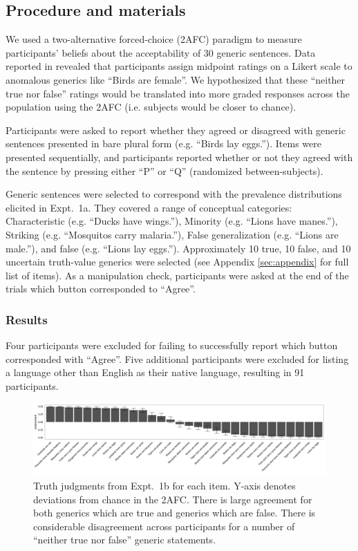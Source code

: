 \documentclass[10pt,letterpaper]{article}
\begin{document}
\subsection{Procedure and materials}

We used a two-alternative forced-choice (2AFC) paradigm to measure participants' beliefs about the acceptability of 30 generic sentences. 
Data reported in  revealed that participants assign midpoint ratings on a Likert scale to anomalous generics like ``Birds are female''. 
We hypothesized that these ``neither true nor false'' ratings would be translated into more graded responses across the population using the 2AFC (i.e. subjects would be closer to chance).

Participants were asked to report whether they agreed or disagreed with generic sentences presented in bare plural form (e.g. ``Birds lay eggs.''). 
Items were presented sequentially, and participants reported whether or not they agreed with the sentence by pressing either ``P'' or ``Q'' (randomized between-subjects). 

Generic sentences were selected to correspond with the prevalence distributions elicited in Expt.~1a. 
They covered a range of conceptual categories: Characteristic (e.g. ``Ducks have wings.''), Minority (e.g. ``Lions have manes.''), Striking (e.g. ``Mosquitos carry malaria.''), False generalization (e.g. ``Lions are male.''), and false (e.g. ``Lions lay eggs.'').
Approximately 10 true, 10 false, and 10 uncertain truth-value generics were selected (see Appendix \ref{sec:appendix} for full list of items).
As a manipulation check, participants were asked at the end of the trials which button corresponded to ``Agree''.

\subsubsection{Results}

Four participants were excluded for failing to successfully report which button corresponded with ``Agree''. 
Five additional participants were excluded for listing a language other than English as their native language, resulting in 91 participants.


\begin{figure}
\centering
    \includegraphics[width=\columnwidth]{truhtjudge_n100}
    \caption{Truth judgments from Expt.~1b for each item. Y-axis denotes deviations from chance in the 2AFC. There is large agreement for both generics which are true and generics which are false. There is considerable disagreement across participants for a number of ``neither true nor false'' generic statements. }
  \label{fig:tj1b}
\end{figure}
\end{document}
